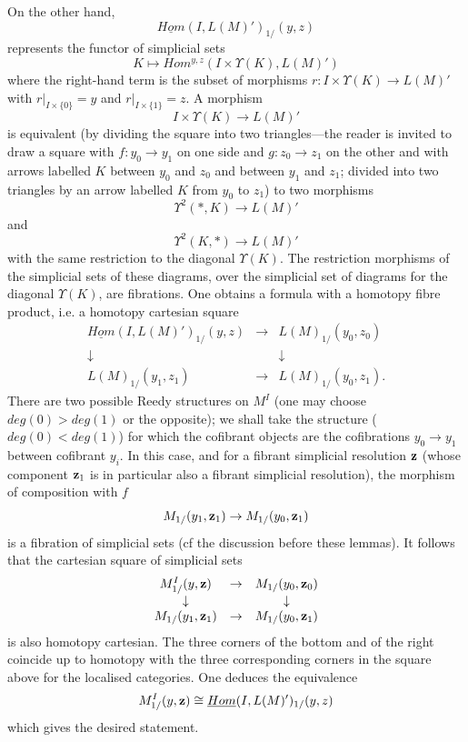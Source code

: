 On the other hand,
$$
\underline{Hom}(I, L(M)')_{1/}(y,z)
$$
represents the functor of simplicial sets
$$
K\mapsto Hom ^{y,z}(I\times \Upsilon (K), L(M)')
$$
where the right-hand term is the subset of morphisms
$r:I\times \Upsilon (K)\rightarrow L(M)'$ with $r|_{I\times \{ 0\} } = y$
and $r|_{I\times \{ 1\} } = z$. A morphism
$$
I\times \Upsilon (K)\rightarrow L(M)'
$$
is equivalent (by dividing the square into two triangles---the reader
is invited to
draw a square with $f: y_0\rightarrow y_1$ on one side and $g:
z_0\rightarrow z_1$ on the other and with arrows labelled $K$ between $y_0$
and $z_0$
and between $y_1$ and $z_1$; divided into two triangles by an arrow labelled
$K$
from $y_0$ to $z_1$) to two morphisms
$$
\Upsilon ^2(\ast , K)\rightarrow
L(M)' $$ and
$$
\Upsilon ^2(K,\ast )\rightarrow L(M)'
$$
with the same restriction to the diagonal $\Upsilon (K)$. The
restriction morphisms of the simplicial sets of these diagrams, over
the simplicial set of diagrams for the diagonal $\Upsilon (K)$, are
fibrations. One obtains a formula with a homotopy fibre product,
i.e. a homotopy cartesian square
$$
\begin{array}{ccc}
\underline{Hom}(I, L(M)')_{1/}(y,z)&\rightarrow & L(M)_{1/}(y_0, z_0)\\
\downarrow && \downarrow \\
L(M)_{1/}(y_1, z_1) & \rightarrow &  L(M)_{1/}(y_0, z_1).
\end{array}
$$
There are two possible Reedy structures on $M^I$ (one may
choose $deg(0)>deg(1)$ or the opposite); we shall take the structure ($deg(0) <
deg (1)$) for which the cofibrant objects are the cofibrations
$y_0\rightarrow y_1$ between cofibrant $y_i$. In this case, and for a
fibrant simplicial resolution ${\bf z}$ (whose component ${\bf z}_1$
is in
particular also a fibrant simplicial resolution), the morphism of
composition with $f$
$$
M_{1/}(y_1, {\bf z}_1)\rightarrow M_{1/}(y_0, {\bf z}_1)
$$
is a fibration of simplicial sets (cf the discussion before these lemmas).
It follows that the cartesian square of simplicial sets
$$
\begin{array}{ccc}
M^I_{1/}(y,{\bf z}) & \rightarrow &  M_{1/}(y_0,{\bf z}_0)\\
\downarrow && \downarrow \\
M_{1/}(y_1,{\bf z}_1)& \rightarrow & M_{1/}(y_0,{\bf z}_1)
\end{array}
$$
is also homotopy cartesian. The three corners
of the bottom and of the right coincide
up to homotopy with the three corresponding corners in the square
above for the localised categories. One deduces the equivalence
$$
M^I_{1/}(y,{\bf z})\cong \underline{Hom}(I, L(M)')_{1/}(y,z)
$$
which gives the desired statement.
\eop





